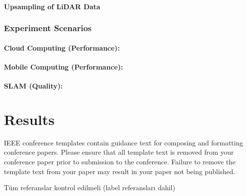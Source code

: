 \documentclass[conference]{IEEEtran}
\begin{document}
\paragraph{Upsampling of LiDAR Data}

\subsubsection{Experiment Scenarios}
\paragraph{Cloud Computing (Performance):}
\paragraph{Mobile Computing (Performance):}
\paragraph{SLAM (Quality):}


\section{Results}



\vspace{12pt}
\color{red}
IEEE conference templates contain guidance text for composing and formatting conference papers. Please ensure that all template text is removed from your conference paper prior to submission to the conference. Failure to remove the template text from your paper may result in your paper not being published.

\vspace{12pt}
\color{red}
Tüm referanslar kontrol edilmeli (label referansları dahil)
\end{document}
